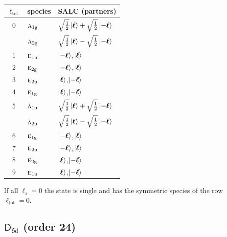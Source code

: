 \documentclass[11pt]{article}
\newcommand{\grp}[1]{\mathsf{#1}}
\newcommand{\irr}[1]{\text{\normalfont\scshape #1}}
\newcommand{\ptag}[1]{\mathrm{#1}}
\begin{document}
\begin{longtable}{c l l}\hline $\ell_{\mathrm{tot}}$ & species & SALC (partners)\\ \hline\endhead

0 & $\irr{a}_{1\ptag{g}}$ & $\sqrt{\tfrac{1}{2}}\ket{\boldsymbol\ell}+\sqrt{\tfrac{1}{2}}\ket{-\boldsymbol\ell}$\\

 & $\irr{a}_{2\ptag{g}}$ & $\sqrt{\tfrac{1}{2}}\ket{\boldsymbol\ell}-\sqrt{\tfrac{1}{2}}\ket{-\boldsymbol\ell}$\\

1 & $\irr{e}_{1\ptag{u}}$ & $\ket{-\boldsymbol\ell}$,\quad $\ket{\boldsymbol\ell}$\\

2 & $\irr{e}_{2\ptag{g}}$ & $\ket{-\boldsymbol\ell}$,\quad $\ket{\boldsymbol\ell}$\\

3 & $\irr{e}_{2\ptag{u}}$ & $\ket{\boldsymbol\ell}$,\quad $\ket{-\boldsymbol\ell}$\\

4 & $\irr{e}_{1\ptag{g}}$ & $\ket{\boldsymbol\ell}$,\quad $\ket{-\boldsymbol\ell}$\\

5 & $\irr{a}_{1\ptag{u}}$ & $\sqrt{\tfrac{1}{2}}\ket{\boldsymbol\ell}+\sqrt{\tfrac{1}{2}}\ket{-\boldsymbol\ell}$\\

 & $\irr{a}_{2\ptag{u}}$ & $\sqrt{\tfrac{1}{2}}\ket{\boldsymbol\ell}-\sqrt{\tfrac{1}{2}}\ket{-\boldsymbol\ell}$\\

6 & $\irr{e}_{1\ptag{g}}$ & $\ket{-\boldsymbol\ell}$,\quad $\ket{\boldsymbol\ell}$\\

7 & $\irr{e}_{2\ptag{u}}$ & $\ket{-\boldsymbol\ell}$,\quad $\ket{\boldsymbol\ell}$\\

8 & $\irr{e}_{2\ptag{g}}$ & $\ket{\boldsymbol\ell}$,\quad $\ket{-\boldsymbol\ell}$\\

9 & $\irr{e}_{1\ptag{u}}$ & $\ket{\boldsymbol\ell}$,\quad $\ket{-\boldsymbol\ell}$\\

\hline\end{longtable}

If all $\ell_s=0$ the state is single and has the symmetric species of the row $\ell_{\mathrm{tot}}=0$.

\subsection*{$\grp{D_{6d}}$ \quad (order 24)}
\end{document}
